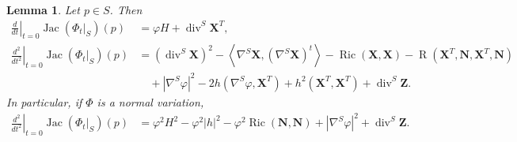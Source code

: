 \documentclass[11pt]{amsart}
\newcommand{\n}[1]{\nabla^\varepsilon_{ #1 }}
\newcommand{\X}{\mathbf{X}}
\newcommand{\Z}{\mathbf{Z}}
\renewcommand{\n}{\mathbf{N}}
\DeclareMathOperator{\ric}{Ric}
\DeclareMathOperator{\divv}{div}
\DeclareMathOperator{\jac}{Jac}
\DeclareMathOperator{\R}{R}
\newtheorem{lemma}[theorem]{Lemma}
\theoremstyle{definition}
\theoremstyle{remark}
\numberwithin{equation}{section}
\begin{document}
\begin{lemma}\label{lemmaderivatejacobiano}
    Let $p\in S$. Then
    \begin{align}
        \left.\frac{d}{dt}\right|_{t=0}\jac\left(\Phi_t|_{S}\right)\left(p\right)&=\varphi H+\divv^S\X^T\label{derijacuno},\\
        \left.\frac{d^2}{dt^2}\right|_{t=0}\jac\left(\Phi_t|_{S}\right)\left(p\right)&=\left(\divv^S\X\right)^2-\left\langle\nabla^S\X,\left(\nabla^S\X\right)^t\right\rangle-\ric(\X,\X)-\R(\X^T,\n,\X^T,\n)\label{derijacdue}\\
        &\quad+\left|\nabla^S\varphi\right|^2-2h\left(\nabla^S\varphi,\X^T\right)+h^2\left(\X^T,\X^T\right)+\divv^S\Z\nonumber.
    \end{align}
    In particular, if $\Phi$ is a normal variation, 
    \begin{equation}\label{derjduenormal}
    \begin{split}
         \left.\frac{d^2}{dt^2}\right|_{t=0}\jac\left(\Phi_t|_{S}\right)\left(p\right)&=\varphi^2H^2-\varphi^2|h|^2-\varphi^2\ric(\n,\n)+\left|\nabla^S\varphi\right|^2+\divv^S\Z.
        \end{split}
    \end{equation}
\end{lemma}
\end{document}
